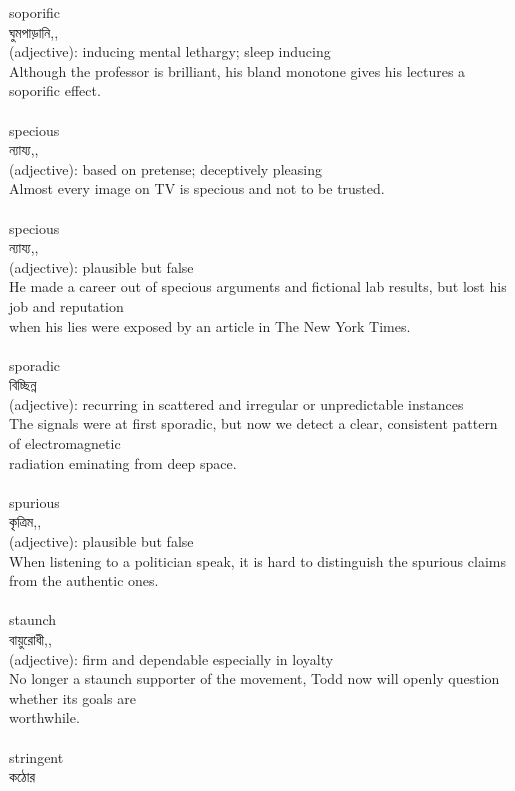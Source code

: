 \documentclass{article}
\begin{document}
{soporific}\\
{ঘুমপাড়ানি,,}\\
{(adjective): inducing mental lethargy; sleep inducing\\Although the professor is brilliant, his bland monotone gives his lectures a soporific effect.\\}\\
{specious}\\
{ন্যায্য,,}\\
{(adjective): based on pretense; deceptively pleasing\\Almost every image on TV is specious and not to be trusted.\\}\\
{specious}\\
{ন্যায্য,,}\\
{(adjective): plausible but false\\He made a career out of specious arguments and fictional lab results, but lost his job and reputation\\when his lies were exposed by an article in The New York Times.\\}\\
{sporadic}\\
{বিচ্ছিন্ন}\\
{(adjective): recurring in scattered and irregular or unpredictable instances\\The signals were at first sporadic, but now we detect a clear, consistent pattern of electromagnetic\\radiation eminating from deep space.\\}\\
{spurious}\\
{কৃত্রিম,,}\\
{(adjective): plausible but false\\When listening to a politician speak, it is hard to distinguish the spurious claims from the authentic ones.\\}\\
{staunch}\\
{বায়ুরোধী,,}\\
{(adjective): firm and dependable especially in loyalty\\No longer a staunch supporter of the movement, Todd now will openly question whether its goals are\\worthwhile.\\}\\
{stringent}\\
{কঠোর}\\
\end{document}
